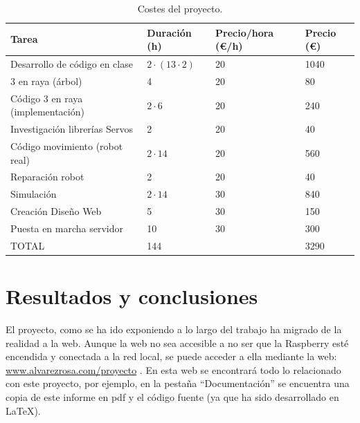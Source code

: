 \documentclass[11pt]{article}
\begin{document}
\begin{table}[htbp]
  \centering
  \renewcommand{\arraystretch}{1.25}
  \setlength{\tabcolsep}{1.5\tabcolsep}
  \caption{Costes del proyecto.}
  \label{tab:costes}
  \begin{tabular}{llll}
    \toprule
    Tarea                             & Duración (h)   & Precio/hora (€/h) & Precio (€) \\
    \midrule
    Desarrollo de código en clase     & $2 \cdot (13 \cdot 2)$ & 20                & 1040       \\
    3 en raya (árbol)                 & 4              & 20                & 80         \\
    Código 3 en raya (implementación) & $2 \cdot 6$        & 20                & 240        \\
    Investigación librerías Servos    & 2              & 20                & 40         \\
    Código movimiento (robot real)    & $2 \cdot 14$       & 20                & 560        \\
    Reparación robot                  & 2              & 20                & 40         \\
    Simulación                        & $2 \cdot 14$       & 30                & 840        \\
    Creación Diseño Web               & 5              & 30                & 150        \\
    Puesta en marcha servidor         & 10             & 30                & 300        \\
    \hline
    TOTAL                             & 144            &                   & 3290       \\
    \bottomrule
  \end{tabular}
\end{table}


\section{Resultados y conclusiones}

El proyecto, como se ha ido exponiendo a lo largo del trabajo ha migrado de la
realidad a la web. Aunque la web no sea accesible a no ser que la Raspberry esté encendida y conectada a la red local, se puede acceder a ella mediante la web: \href{www.alvarezrosa.com/proyecto}{www.alvarezrosa.com/proyecto} . En esta web se encontrará todo lo relacionado con este proyecto, por ejemplo, en la pestaña ``Documentación'' se encuentra una copia de este informe en pdf y el código fuente (ya que ha sido
desarrollado en \LaTeX). \\
\end{document}
